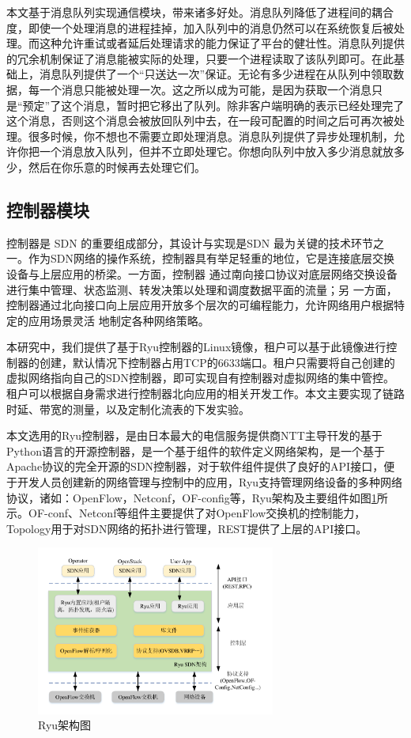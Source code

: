 本文基于消息队列实现通信模块，带来诸多好处。消息队列降低了进程间的耦合度，即使一个处理消息的进程挂掉，加入队列中的消息仍然可以在系统恢复后被处理。而这种允许重试或者延后处理请求的能力保证了平台的健壮性。消息队列提供的冗余机制保证了消息能被实际的处理，只要一个进程读取了该队列即可。在此基础上，消息队列提供了一个“只送达一次”保证。无论有多少进程在从队列中领取数据，每一个消息只能被处理一次。这之所以成为可能，是因为获取一个消息只是“预定”了这个消息，暂时把它移出了队列。除非客户端明确的表示已经处理完了这个消息，否则这个消息会被放回队列中去，在一段可配置的时间之后可再次被处理。很多时候，你不想也不需要立即处理消息。消息队列提供了异步处理机制，允许你把一个消息放入队列，但并不立即处理它。你想向队列中放入多少消息就放多少，然后在你乐意的时候再去处理它们。

\subsection{控制器模块}
控制器是 SDN 的重要组成部分，其设计与实现是SDN 最为关键的技术环节之一。作为SDN网络的操作系统，控制器具有举足轻重的地位，它是连接底层交换设备与上层应用的桥梁。一方面，控制器
通过南向接口协议对底层网络交换设备进行集中管理、状态监测、转发决策以处理和调度数据平面的流量；另
一方面，控制器通过北向接口向上层应用开放多个层次的可编程能力，允许网络用户根据特定的应用场景灵活
地制定各种网络策略。

本研究中，我们提供了基于Ryu控制器的Linux镜像，租户可以基于此镜像进行控制器的创建，默认情况下控制器占用TCP的6633端口。租户只需要将自己创建的虚拟网络指向自己的SDN控制器，即可实现自有控制器对虚拟网络的集中管控。租户可以根据自身需求进行控制器北向应用的相关开发工作。本文主要实现了链路时延、带宽的测量，以及定制化流表的下发实验。

本文选用的Ryu控制器，是由日本最大的电信服务提供商NTT主导幵发的基于Python语言的开源控制器，是一个基于组件的软件定义网络架构，是一个基于Apache协议的完全开源的SDN控制器，对于软件组件提供了良好的API接口，便于开发人员创建新的网络管理与控制中的应用，Ryu支持管理网络设备的多种网络协议，诸如：OpenFlow，Netconf，OF-config等，Ryu架构及主要组件如图\ref{fig:ryu}所示\cite{Ryu-1}。OF-conf、Netconf等组件主要提供了对OpenFlow交换机的控制能力，Topology用于对SDN网络的拓扑进行管理，REST提供了上层的API接口。

\begin{figure}[!htb]
  \centering
  \includegraphics[width=0.7\textwidth]{logo/ryu}
  \caption{Ryu架构图}
  \label{fig:ryu}
\end{figure}

